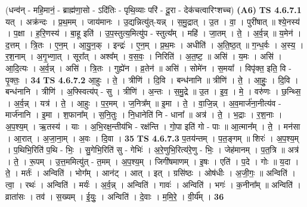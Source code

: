 \documentclass[17pt]{extarticle}
\begin{document}
                      (धन्व॑न् - महि॒मानं॒ - ब्राह्म॑णा॒सो - ऽदि॑तिः - पृथि॒व्याः परि॑ - दू॒रा - देक॑चत्वारिꣳशच्च)  \textbf{(A6)} \newline \newline
                                \textbf{ TS 4.6.7.1} \newline
                  यत् । अक्र॑न्दः । प्र॒थ॒मम् । जाय॑मानः । उ॒द्यन्नित्यु॑त्-यन्न् । स॒मु॒द्रात् । उ॒त । वा॒ । पुरी॑षात् ॥ श्ये॒नस्य॑ । प॒क्षा । ह॒रि॒णस्य॑ । बा॒हू इति॑ । उ॒प॒स्तुत्य॒मित्यु॑प - स्तुत्य᳚म् । महि॑ । जा॒तम् । ते॒ । अ॒र्व॒न्न् ॥ य॒मेन॑ । द॒त्तम् । त्रि॒तः । ए॒न॒म् । आ॒यु॒न॒क् । इन्द्रः॑ । ए॒न॒म् । प्र॒थ॒मः । अधीति॑ । अ॒ति॒ष्ठ॒त् ॥ ग॒न्ध॒र्वः । अ॒स्य॒ । र॒श॒नाम् । अ॒गृ॒भ्णा॒त् । सूरा᳚त् । अश्व᳚म् । व॒स॒वः॒ । निरिति॑ । अ॒त॒ष्ट॒ ॥ असि॑ । य॒मः । असि॑ । आ॒दि॒त्यः । अ॒र्व॒न्न् । असि॑ । त्रि॒तः । गुह्ये॑न । व्र॒तेन॑ ॥ असि॑ । सोमे॑न । स॒मया᳚ । विपृ॑क्त॒ इति॒ वि - पृ॒क्तः॒ । \textbf{  34} \newline
                  \newline
                                \textbf{ TS 4.6.7.2} \newline
                  आ॒हुः । ते॒ । त्रीणि॑ । दि॒वि । बन्ध॑नानि ॥ त्रीणि॑ । ते॒ । आ॒हुः॒ । दि॒वि । बन्ध॑नानि । त्रीणि॑ । अ॒फ्स्वित्य॑प् - सु । त्रीणि॑ । अ॒न्तः । स॒मु॒द्रे ॥ उ॒त । इ॒व॒ । मे॒ । वरु॑णः । छ॒न्थ्सि॒ । अ॒र्व॒न्न् । यत्र॑ । ते॒ । आ॒हुः । प॒र॒मम् । ज॒नित्र᳚म् ॥ इ॒मा । ते॒ । वा॒जि॒न्न् । अ॒व॒मार्ज॑ना॒नीत्य॑व - मार्ज॑नानि । इ॒मा । श॒फाना᳚म् । स॒नि॒तुः । नि॒धानेति॑ नि - धाना᳚ ॥ अत्र॑ । ते॒ । भ॒द्राः । र॒श॒नाः । अ॒प॒श्य॒म् । ऋ॒तस्य॑ । याः । अ॒भि॒रक्ष॒न्तीय॑भि - रक्ष॑न्ति । गो॒पा इति॑ गो - पाः ॥ आ॒त्मान᳚म् । ते॒ । मन॑सा । आ॒रात् । अ॒जा॒ना॒म् । अ॒वः । दि॒वा । \textbf{  35} \newline
                  \newline
                                \textbf{ TS 4.6.7.3} \newline
                  प॒तय॑न्तम् । प॒त॒ङ्गम् ॥ शिरः॑ । अ॒प॒श्य॒म् । प॒थिभि॒रिति॑ प॒थि - भिः॒ । सु॒गेभि॒रिति॑ सु - गेभिः॑ । अ॒रे॒णुभि॒रित्य॑रे॒णु - भिः॒ । जेह॑मानम् । प॒त॒त्रि ॥ अत्र॑ । ते॒ । रू॒पम् । उ॒त्त॒ममित्यु॑त् - त॒मम् । अ॒प॒श्य॒म् । जिगी॑षमाणम् । इ॒षः । एति॑ । प॒दे । गोः ॥ य॒दा । ते॒ । मर्तः॑ । अन्विति॑ । भोग᳚म् । आन॑ट् । आत् । इत् । ग्रसि॑ष्ठः । ओष॑धीः । अ॒जी॒गः॒ ॥ अन्विति॑ । त्वा॒ । रथः॑ । अन्विति॑ । मर्यः॑ । अ॒र्व॒न्न् । अन्विति॑ । गावः॑ । अन्विति॑ । भगः॑ । क॒नीना᳚म् ॥ अन्विति॑ । व्राता॑सः । तव॑ । स॒ख्यम् । ई॒युः॒ । अन्विति॑ । दे॒वाः । म॒मि॒रे॒ । वी॒र्य᳚म् । \textbf{  36} \newline
                  \newline
\end{document}
